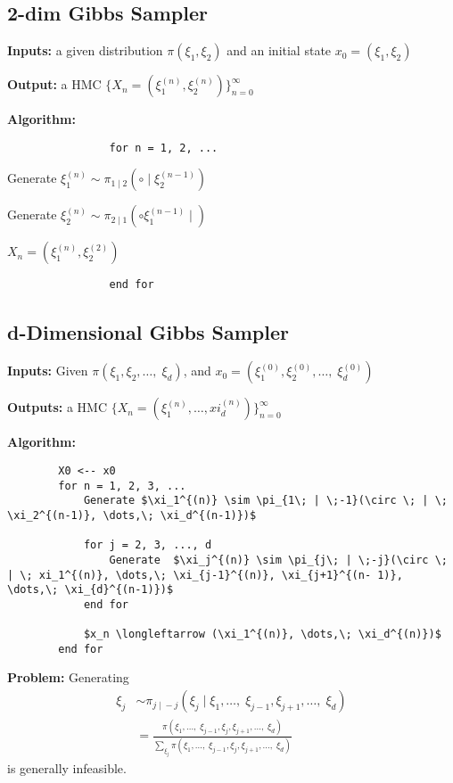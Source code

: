 \documentclass[12pt]{article}
\begin{document}
    \subsection{2-dim Gibbs Sampler} 
        \textbf{Inputs:} a given distribution $\pi(\xi_1, \xi_2)$ and an initial state $x_0 = (\xi_1, \xi_2)$

        \textbf{Output:} a HMC $\{X_n = (\xi_1^{(n)}, \xi_2^{(n)})\}_{n=0}^\infty$

        \textbf{Algorithm:} 
            \begin{verbatim}
                for n = 1, 2, ...
            \end{verbatim}
            \begin{center}
                Generate $\xi_1^{(n)} \sim \pi_{1\; | \;2}(\circ \; | \; \xi_2^{(n-1)})$

                Generate $\xi_2^{(n)} \sim \pi_{2\; | \;1}(\circ \xi_1^{(n-1)} \; | \;)$

                $X_n = (\xi_1^{(n)}, \xi_2^{(2)})$
            \end{center}
            \begin{verbatim}
                end for
            \end{verbatim}

    \subsection{d-Dimensional Gibbs Sampler}
        \textbf{Inputs:} Given $\pi(\xi_1, \xi_2, \dots,\; \xi_d)$, and $x_0 = (\xi_1^{(0)}, \xi_2^{(0)}, \dots,\; \xi_d^{(0)})$

        \textbf{Outputs:} a HMC $\{X_n = (\xi_1^{(n)}, \dots, xi_d^{(n)})\}_{n=0}^\infty$

        \textbf{Algorithm:}
        \begin{lstlisting}
        X0 <-- x0
        for n = 1, 2, 3, ...
            Generate $\xi_1^{(n)} \sim \pi_{1\; | \;-1}(\circ \; | \; \xi_2^{(n-1)}, \dots,\; \xi_d^{(n-1)})$
        
            for j = 2, 3, ..., d
                Generate  $\xi_j^{(n)} \sim \pi_{j\; | \;-j}(\circ \; | \; xi_1^{(n)}, \dots,\; \xi_{j-1}^{(n)}, \xi_{j+1}^{(n- 1)}, \dots,\; \xi_{d}^{(n-1)})$
            end for

            $x_n \longleftarrow (\xi_1^{(n)}, \dots,\; \xi_d^{(n)})$
        end for
        \end{lstlisting}

        \textbf{Problem:} Generating 
        \begin{align*}
            \xi_j &\sim \pi_{j \; | \; -j}(\xi_j \; | \; \xi_1, \dots, \; \xi_{j-1}, \xi_{j+1}, \dots,\; \xi_d)\\
            &= \frac{\pi(\xi_1, \dots, \; \xi_{j-1}, \xi_j, \xi_{j+1}, \dots,\; \xi_d)}{\sum_{\xi_j}\pi(\xi_1, \dots, \; \xi_{j-1}, \xi_j, \xi_{j+1}, \dots,\; \xi_d)}
        \end{align*}
        is generally infeasible. 
\end{document}
